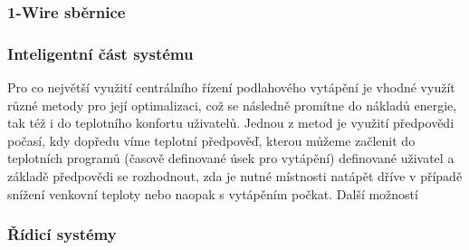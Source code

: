 \subsubsection{1-Wire sběrnice}

\subsubsection{Inteligentní část systému}
Pro co největší využití centrálního řízení podlahového vytápění je vhodné využít různé metody pro její optimalizaci, což se následně promítne do nákladů energie, tak též i do teplotního konfortu uživatelů. Jednou z metod je využití předpovědi počasí, kdy dopředu víme teplotní předpověď, kterou můžeme začlenit do teplotních programů (časově definované úsek pro vytápění) definované uživatel a základě  předpovědi se rozhodnout, zda je nutné místnosti natápět dříve v případě snížení venkovní teploty nebo naopak s vytápěním počkat. Další možností 

\subsubsection{Řídicí systémy}